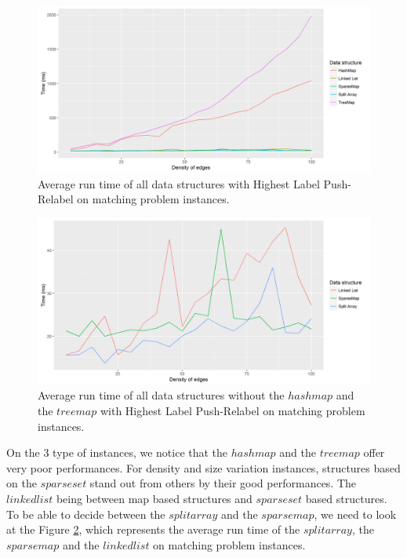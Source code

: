 \begin{figure}[H]
\begin{center}
\includegraphics[scale=0.5]{images/results/prmeanmatching.png}
\caption{Average run time of all data structures with Highest Label Push-Relabel on matching problem instances.}
\label{fig:prmeanmatching}
\end{center}
\end{figure}

\begin{figure}[H]
\begin{center}
\includegraphics[scale=0.5]{images/results/prmeanmatching2.png}
\caption{Average run time of all data structures without the $hashmap$ and the $treemap$ with Highest Label Push-Relabel on matching problem instances.}
\label{fig:prmeanmatching2}
\end{center}
\end{figure}
On the 3 type of instances, we notice that the $hashmap$ and the $treemap$ offer very poor performances. For density and size variation instances, structures based on the $sparse set$ stand out from others by their good performances. The $linked list$ being between map based structures and  $sparse set$ based structures. To be able to decide between the $split array$ and the $sparse map$, we need to look at the Figure \ref{fig:prmeanmatching2}, which represents the average run time of the $split array$, the $sparse map$ and the $linked list$ on matching problem instances.

